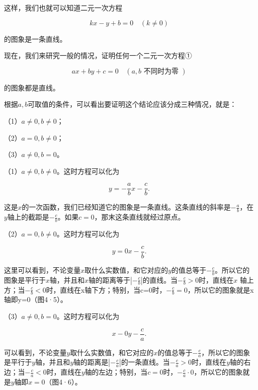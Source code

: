 这样，我们也就可以知道二元一次方程

\[
k x - y + b = 0 \quad (k \neq 0)
\]

的图象是一条直线。

现在，我们来研究一般的情况，证明任何一个二元一次方程①

\[
a x + b y + c = 0 \quad (a, b \text{ 不同时为零 })
\]

的图象都是直线。

根据\(a, b\)可取值的条件，可以看出要证明这个结论应该分成三种情况，就是：

（1）\(a \neq 0, b \neq 0\)；

（2）\(a = 0, b \neq 0\)；

（3）\(a \neq 0, b = 0\)。

（1）\(a \neq 0, b \neq 0\)。这时方程可以化为

\[
y = - \frac{a}{b} x - \frac{c}{b}. \tag {1}
\]

这是\(x\)的一次函数，我们已经知道它的图象是一条直线。这条直线的斜率是\(-\frac{a}{b}\)，在\(y\)轴上的截距是\(-\frac{c}{b}\)。如果\(c = 0\)，那末这条直线就经过原点。

（2）\(a = 0, b \neq 0\)。这时方程可以化为

\[
y = 0 x - \frac{c}{b}. \tag {2}
\]

这里可以看到，不论变量\(x\)取什么实数值，和它对应的\(y\)的值总等于\(-\frac{c}{b}\)。所以它的图象是平行于\(x\)轴，并且和\(x\)轴的距离等于\(\left| -\frac{c}{b} \right|\)的直线。当\(-\frac{c}{b} > 0\)时，直线在\(x\)
轴上方；当\(-\frac{c}{b}<0\)时，直线在x轴下方；特别，当c=0时，\(-\frac{c}{b}=0\)，所以它的图象就是x轴即y=0（图4·5）。

（3）\(a \neq 0, b = 0\)。这时方程可以化为

\[
x - 0 y - \frac{c}{a}. \tag {3}
\]

可以看到，不论变量\(y\)取什么实数值，和它对应的\(x\)的值总等于\(-\frac{c}{a}\)，所以它的图象是平行于\(y\)轴，并且和\(y\)轴的距离是\(\left| -\frac{c}{a} \right|\)的一条直线。当\(-\frac{c}{a} > 0\)时，直线在\(y\)轴的右边；当\(-\frac{c}{a} < 0\)时，直线在\(y\)轴的左边；特别，当\(c = 0\)时，\(-\frac{c}{a} \cdot 0\)，所以它的图象就是\(y\)轴即\(x = 0\)（图4·6）。


